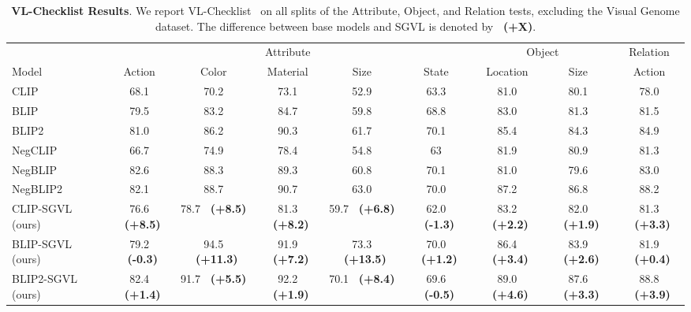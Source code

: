 \documentclass[11pt]{article}
\newcommand{\tablestyle}[2]{\setlength{\tabcolsep}{#1}\renewcommand{\arraystretch}{#2}\centering\footnotesize}
\newcommand{\gcol}[1]{{\bf \fontsize{6.5}{42}\selectfont \color{citecolor!80}~(#1)}}
\newcommand{\rcol}[1]{{\bf \fontsize{6.5}{42}\selectfont \color{lightred!180}~(#1)}}
\begin{document}
\begin{table*}[t!]
\label{supp:tab:res_winoground_full}
\end{table*} \begin{table*}[t!]
\centering
	\tablestyle{0.8pt}{1.}
	\scriptsize
    \begin{small}
    \begin{tabular}{l|ccccc|cc|c} 
            \toprule
             &\multicolumn{5}{c|}{Attribute} &\multicolumn{2}{c|}{Object}&\multicolumn{1}{c}{Relation}\\
            Model & Action & Color & Material & Size & State & Location & Size & Action\\
            \midrule            
            CLIP  & 68.1 &70.2 & 73.1 & 52.9 &63.3 &81.0 & 80.1 & 78.0\\
            BLIP  & 79.5 &83.2 & 84.7 & 59.8 &68.8 &83.0 & 81.3 & 81.5\\
            BLIP2   &81.0  & 86.2 & 90.3  & 61.7  & 70.1 & 85.4  & 84.3 & 84.9 \\
            \midrule
            NegCLIP &66.7  &74.9  &78.4  &54.8  & 63  & 81.9  &80.9  & 81.3\\
            NegBLIP &82.6  &88.3  &89.3  &60.8  &70.1  &81.0  &79.6  &83.0 \\
            NegBLIP2  &82.1  &88.7  &90.7  &63.0  &70.0  &87.2  &86.8  &88.2 \\
            \midrule
            CLIP-SGVL (ours) & 76.6 \gcol{+8.5} & 78.7 \gcol{+8.5} & 81.3 \gcol{+8.2} & 59.7 \gcol{+6.8}  & 62.0 \rcol{-1.3} & 83.2 \gcol{+2.2} & 82.0 \gcol{+1.9} & 81.3 \gcol{+3.3}\\
            BLIP-SGVL (ours)   & 79.2 \rcol{-0.3} & 94.5 \gcol{+11.3} & 91.9 \gcol{+7.2} & 73.3 \gcol{+13.5} & 70.0 \gcol{+1.2} & 86.4 \gcol{+3.4} & 83.9 \gcol{+2.6} & 81.9 \gcol{+0.4}\\
            BLIP2-SGVL (ours) &82.4 \gcol{+1.4}  & 91.7 \gcol{+5.5} & 92.2 \gcol{+1.9}  & 70.1 \gcol{+8.4}  & 69.6 \rcol{-0.5}  &89.0 \gcol{+4.6}  &87.6 \gcol{+3.3}  &88.8 \gcol{+3.9}\\
            \bottomrule        
    \end{tabular}
    \end{small}
\caption{
    \textbf{VL-Checklist Results}. We report VL-Checklist~\cite{vlc} on all splits of the Attribute, Object, and Relation tests, excluding the Visual Genome dataset. The difference between base models and SGVL is denoted by \gcol{+X}.}



\end{table*}
\end{document}
